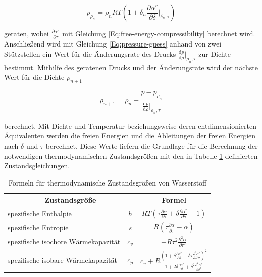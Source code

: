 \begin{equation}\label{Eq:pressure-guess}
    p_{\rho_n}=\rho_nRT\left(1+\delta_n\frac{\partial\alpha^r}{\partial\delta}|_{\delta_n, \tau}\right)
\end{equation}

geraten, wobei $\frac{\partial\alpha^r}{\partial\tau}$ mit Gleichung \ref{Eq:free-energy-compressibility} berechnet wird. Anschließend wird mit Gleichung \ref{Eq:pressure-guess} anhand von zwei Stützstellen ein Wert für die Änderungsrate des Drucks $\frac{\mathrm{d}p}{\mathrm{d}\rho}|_{\rho_n,\tau}$ zur Dichte bestimmt. Mithilfe des geratenen Drucks und der Änderungsrate wird der nächste Wert für die Dichte $\rho_{n+1}$

\begin{equation}\label{Eq:density_calc}
    \rho_{n+1}=\rho_n+\frac{p-p_{\rho_n}}{\frac{\mathrm{d}p}{\mathrm{d}\rho}|_{\rho_n,\tau}}
\end{equation}

berechnet. Mit Dichte und Temperatur beziehungsweise deren entdimensionierten Äquivalenten werden die freien Energien und die Ableitungen der freien Energien nach $\delta$ und $\tau$ berechnet. Diese Werte liefern die Grundlage für die Berechnung der notwendigen thermodynamischen Zustandsgrößen mit den in Tabelle \ref{Tab:thermodynamic_properties_h2} definierten Zustandsgleichungen.

\begin{table}[ht]
    \centering
	\caption{Formeln für thermodynamische Zustandsgrößen von Wasserstoff}
	\begin{tabular} {|l|c|c|} \hline%
		\multicolumn{2}{|c|}{Zustandsgröße}  & Formel\\ \hline\hline%
		  spezifische Enthalpie &$h$ 		  & $RT(\tau\frac{\partial\alpha}{\partial\tau}+\delta\frac{\partial\alpha^r}{\partial\delta}+1)$ \\ \hline%
		  spezifische Entropie& $s$ 		      &  $R(\tau\frac{\partial\alpha}{\partial\tau}-\alpha)$\\ \hline%
		spezifische isochore Wärmekapazität &$c_v$ 	    &  $-R\tau^2\frac{\partial^2\alpha}{\partial\tau^2}$\\ \hline%
        spezifische isobare Wärmekapazität &$c_p$        &  $c_v+R\frac{\left(1+\delta\frac{\partial\alpha^r}{\partial\delta}-\delta\tau\frac{\partial^2\alpha^r}{\partial\delta\partial\tau}\right)^2}{1+2\delta\frac{\partial\alpha^r}{\partial\delta}+\delta^2\frac{\partial^2\alpha^r}{\partial\delta^2}}$\\ \hline%
	\end{tabular}	
    \label{Tab:thermodynamic_properties_h2}%
\end{table}
\FloatBarrier 

